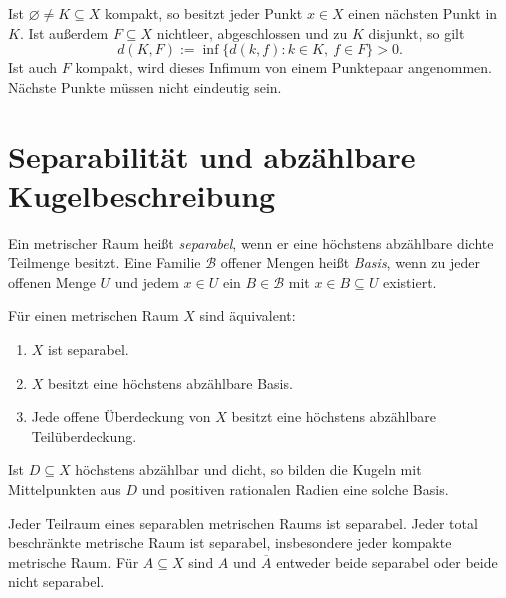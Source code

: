 \begin{theorem}
Ist $\varnothing\ne K\subseteq X$ kompakt, so besitzt jeder Punkt $x\in X$
einen nächsten Punkt in $K$. Ist außerdem $F\subseteq X$ nichtleer,
abgeschlossen und zu $K$ disjunkt, so gilt
\[
 d(K,F):=\inf\{d(k,f):k\in K,\ f\in F\}>0.
\]
Ist auch $F$ kompakt, wird dieses Infimum von einem Punktepaar angenommen.
Nächste Punkte müssen nicht eindeutig sein.
\end{theorem}

\section{Separabilität und abzählbare Kugelbeschreibung}

\begin{definition}
Ein metrischer Raum heißt \emph{separabel}, wenn er eine höchstens
abzählbare dichte Teilmenge besitzt. Eine Familie $\mathcal B$ offener
Mengen heißt \emph{Basis}, wenn zu jeder offenen Menge $U$ und jedem
$x\in U$ ein $B\in\mathcal B$ mit $x\in B\subseteq U$ existiert.
\end{definition}

\begin{theorem}
\label{b47guide:thm:separable}
Für einen metrischen Raum $X$ sind äquivalent:
\begin{enumerate}
\item $X$ ist separabel.
\item $X$ besitzt eine höchstens abzählbare Basis.
\item Jede offene Überdeckung von $X$ besitzt eine höchstens abzählbare
Teilüberdeckung.
\end{enumerate}
Ist $D\subseteq X$ höchstens abzählbar und dicht, so bilden die Kugeln
mit Mittelpunkten aus $D$ und positiven rationalen Radien eine solche Basis.
\cite{countable-notes}
\end{theorem}

\begin{theorem}
Jeder Teilraum eines separablen metrischen Raums ist separabel. Jeder
total beschränkte metrische Raum ist separabel, insbesondere jeder
kompakte metrische Raum. Für $A\subseteq X$ sind $A$ und $\overline A$
entweder beide separabel oder beide nicht separabel.
\end{theorem}